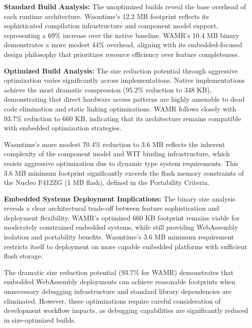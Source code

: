 \textbf{Standard Build Analysis:} The unoptimized builds reveal the base overhead of each runtime architecture. Wasmtime's 12.2 MB footprint reflects its sophisticated compilation infrastructure and component model support, representing a 69\% increase over the native baseline. WAMR's 10.4 MB binary demonstrates a more modest 44\% overhead, aligning with its embedded-focused design philosophy that prioritizes resource efficiency over feature completeness.

\textbf{Optimized Build Analysis:} The size reduction potential through aggressive optimization varies significantly across implementations. Native implementations achieve the most dramatic compression (95.2\% reduction to 348 KB), demonstrating that direct hardware access patterns are highly amenable to dead code elimination and static linking optimizations. WAMR follows closely with 93.7\% reduction to 660 KB, indicating that its architecture remains compatible with embedded optimization strategies.

Wasmtime's more modest 70.4\% reduction to 3.6 MB reflects the inherent complexity of the component model and WIT binding infrastructure, which resists aggressive optimization due to dynamic type system requirements. This 3.6 MB minimum footprint significantly exceeds the flash memory constraints of the Nucleo F412ZG (1 MB flash), defined in the Portability Criteria.

\textbf{Embedded Systems Deployment Implications:} The binary size analysis reveals a clear architectural trade-off between feature sophistication and deployment flexibility. WAMR's optimized 660 KB footprint remains viable for moderately constrained embedded systems, while still providing WebAssembly isolation and portability benefits. Wasmtime's 3.6 MB minimum requirement restricts itself to deployment on more capable embedded platforms with sufficient flash storage.

The dramatic size reduction potential (93.7\% for WAMR) demonstrates that embedded WebAssembly deployments can achieve reasonable footprints when unnecessary debugging infrastructure and standard library dependencies are eliminated. However, these optimizations require careful consideration of development workflow impacts, as debugging capabilities are significantly reduced in size-optimized builds.

